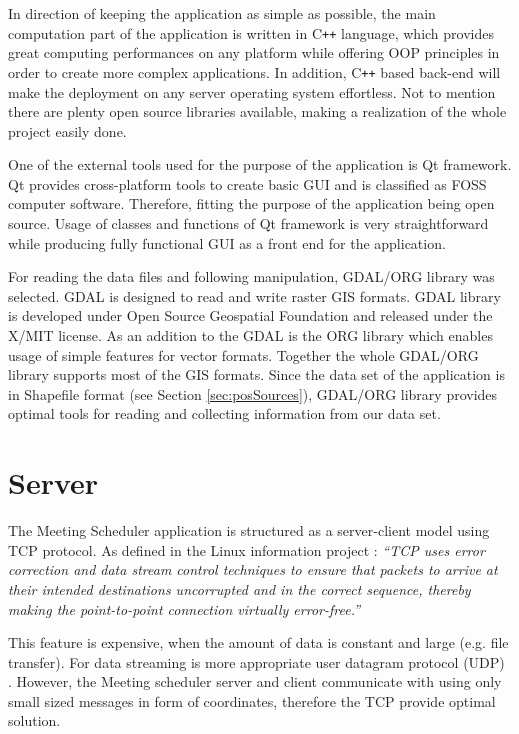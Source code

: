 \documentclass[thesis=M,english]{FITthesis}[2012/10/20]
\begin{document}
In direction of keeping the application as simple as possible, the main computation part of the application is written in C\texttt{++} language, which provides great computing performances on any platform while offering OOP principles in order to create more complex applications. In addition, C\texttt{++} based back-end will make the deployment on any server operating system effortless. Not to mention there are plenty open source libraries available, making a realization of the whole project easily done.  

One of the external tools used for the purpose of the application is Qt framework. Qt provides cross-platform tools to create basic GUI and is classified as FOSS computer software. Therefore, fitting the purpose of the application being open source. 
Usage of classes and functions of Qt framework is very straightforward while producing fully functional GUI as a front end for the application. 

For reading the data files and following manipulation, GDAL/ORG library was selected. GDAL is designed to read and write raster GIS formats. GDAL library is developed under Open Source Geospatial Foundation and released under the X/MIT license. 
As an addition to the GDAL is the ORG library which enables usage of simple features for vector formats. Together the whole GDAL/ORG library supports most of the GIS formats. %
Since the data set of the application is in Shapefile format (see Section \ref{sec:posSources}), GDAL/ORG library provides optimal tools for reading and collecting information from our data set.

\section{Server}
\label{sec:server}
The Meeting Scheduler application is structured as a server-client model using TCP protocol. As defined in the Linux information project \cite{TCP17}:  \textit{``TCP uses error correction and data stream control techniques to ensure that packets to arrive at their intended destinations uncorrupted and in the correct sequence, thereby making the point-to-point connection virtually error-free.''} 

This feature is expensive, when the amount of data is constant and large (e.g. file transfer). For data streaming is more appropriate user datagram protocol (UDP) \cite{Kurose10}.
However, the Meeting scheduler server and client communicate with using only small sized messages in form of coordinates, therefore the TCP provide optimal solution. 
\end{document}
